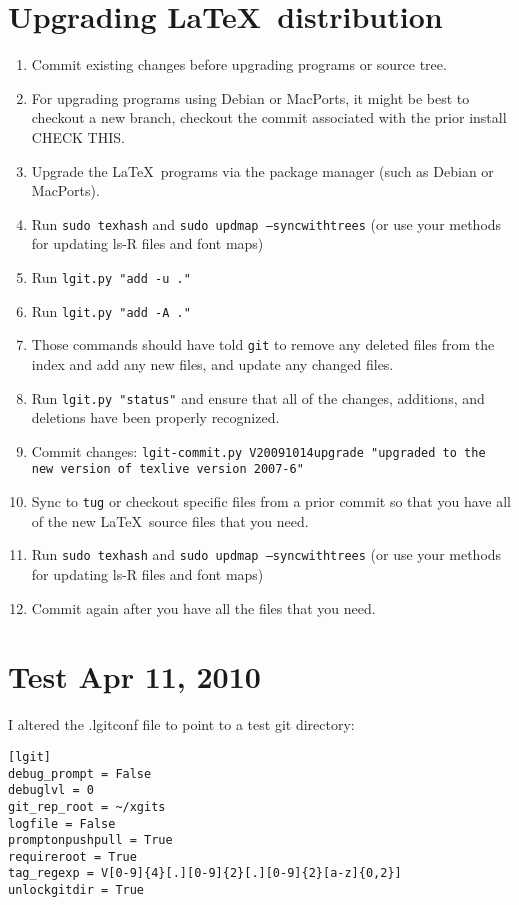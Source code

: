 \documentclass{ltxdoc}
\def\ucmd#1{{\tt {#1}}}
\begin{document}
\section{Upgrading \LaTeX\ distribution}
\begin{enumerate}
\item{Commit existing changes before upgrading programs or source tree.}
\item{For upgrading programs using Debian or MacPorts, it might be best to     checkout a new branch, checkout the commit associated with the prior     install CHECK THIS.}
\item{Upgrade the \LaTeX\ programs via the package manager (such as Debian or     MacPorts).}
\item{Run \ucmd{sudo texhash} and \ucmd{sudo updmap --syncwithtrees} (or use     your methods for updating ls-R files and font maps)}
\item{Run \ucmd{lgit.py "add -u ."}}
\item{Run \ucmd{lgit.py "add -A ."}}
\item{Those commands should have told \ucmd{git} to remove any deleted files     from the index and add any new files, and update any changed files.}
\item{Run \ucmd{lgit.py "status"} and ensure that all of the changes,     additions, and deletions have been properly recognized.}
\item{Commit changes: \ucmd{lgit-commit.py V20091014upgrade "upgraded to the       new version of texlive version 2007-6"}}
\item{Sync to \ucmd{tug} or checkout specific files from a prior commit so     that you have all of the new \LaTeX\ source files that you need.}
\item{Run \ucmd{sudo texhash} and \ucmd{sudo updmap --syncwithtrees} (or use     your methods for updating ls-R files and font maps)}
\item{Commit again after you have all the files that you need.}
\end{enumerate}


\section{Test Apr 11, 2010}
I altered the .lgitconf file to point to a test git directory:
\begin{verbatim}
[lgit]
debug_prompt = False
debuglvl = 0
git_rep_root = ~/xgits
logfile = False
promptonpushpull = True
requireroot = True
tag_regexp = V[0-9]{4}[.][0-9]{2}[.][0-9]{2}[a-z]{0,2}]
unlockgitdir = True
\end{verbatim}
\end{document}
